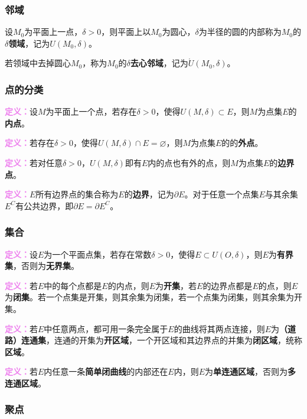 \subsubsection{邻域}

设$M_0$为平面上一点，$\delta>0$，则平面上以$M_0$为圆心，$\delta$为半径的圆的内部称为$M_0$的\textbf{$\delta$领域}，记为$U(M_0,\delta)$。

若领域中去掉圆心$M_0$，称为$M_0$的\textbf{$\delta$去心邻域}，记为$\mathring{U}(M_0,\delta)$。

\subsubsection{点的分类}

\textcolor{violet}{\textbf{定义：}}设$M$为平面上一个点，若存在$\delta>0$，使得$U(M,\delta)\subset E$，则$M$为点集$E$的\textbf{内点}。

\textcolor{violet}{\textbf{定义：}}若存在$\delta>0$，使得$U(M,\delta)\cap E=\varnothing$，则$M$为点集$E$的的\textbf{外点}。

\textcolor{violet}{\textbf{定义：}}若对任意$\delta>0$，$U(M,\delta)$即有$E$内的点也有外的点，则$M$为点集$E$的\textbf{边界点}。

\textcolor{violet}{\textbf{定义：}}$E$所有边界点的集合称为$E$的\textbf{边界}，记为$\partial E$。对于任意一个点集$E$与其余集$E^C$有公共边界，即$\partial E=\partial E^C$。

\subsubsection{集合}

\textcolor{violet}{\textbf{定义：}}设$E$为一个平面点集，若存在常数$\delta>0$，使得$E\subset U(O,\delta)$，则$E$为\textbf{有界集}，否则为\textbf{无界集}。

\textcolor{violet}{\textbf{定义：}}若$E$中的每个点都是$E$的内点，则$E$为\textbf{开集}，若$E$的边界点都是$E$的点，则$E$为\textbf{闭集}。若一个点集是开集，则其余集为闭集，若一个点集为闭集，则其余集为开集。

\textcolor{violet}{\textbf{定义：}}若$E$中任意两点，都可用一条完全属于$E$的曲线将其两点连接，则$E$为\textbf{（道路）连通集}，连通的开集为\textbf{开区域}，一个开区域和其边界点的并集为\textbf{闭区域}，统称\textbf{区域}。

\textcolor{violet}{\textbf{定义：}}若$E$内任意一条\textbf{简单闭曲线}的内部还在$E$内，则$E$为\textbf{单连通区域}，否则为\textbf{多连通区域}。

\subsubsection{聚点}

